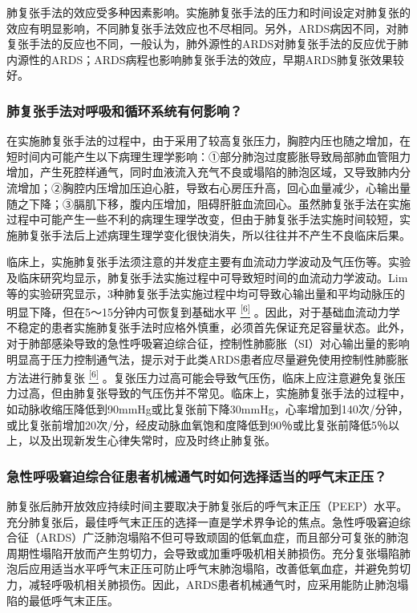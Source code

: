 肺复张手法的效应受多种因素影响。实施肺复张手法的压力和时间设定对肺复张的效应有明显影响，不同肺复张手法效应也不尽相同。另外，ARDS病因不同，对肺复张手法的反应也不同，一般认为，肺外源性的ARDS对肺复张手法的反应优于肺内源性的ARDS；ARDS病程也影响肺复张手法的效应，早期ARDS肺复张效果较好。

\subsubsection{肺复张手法对呼吸和循环系统有何影响？}

在实施肺复张手法的过程中，由于采用了较高复张压力，胸腔内压也随之增加，在短时间内可能产生以下病理生理学影响：①部分肺泡过度膨胀导致局部肺血管阻力增加，产生死腔样通气，同时血液流入充气不良或塌陷的肺泡区域，又导致肺内分流增加；②胸腔内压增加压迫心脏，导致右心房压升高，回心血量减少，心输出量随之下降；③膈肌下移，腹内压增加，阻碍肝脏血流回心。虽然肺复张手法在实施过程中可能产生一些不利的病理生理学改变，但由于肺复张手法实施时间较短，实施肺复张手法后上述病理生理学变化很快消失，所以往往并不产生不良临床后果。

临床上，实施肺复张手法须注意的并发症主要有血流动力学波动及气压伤等。实验及临床研究均显示，肺复张手法实施过程中可导致短时间的血流动力学波动。Lim等的实验研究显示，3种肺复张手法实施过程中均可导致心输出量和平均动脉压的明显下降，但在5～15分钟内可恢复到基础水平
\protect\hyperlink{text00011.htmlux5cux23ch6-10}{\textsuperscript{{[}6{]}}}
。因此，对于基础血流动力学不稳定的患者实施肺复张手法时应格外慎重，必须首先保证充足容量状态。此外，对于肺部感染导致的急性呼吸窘迫综合征，控制性肺膨胀（SI）对心输出量的影响明显高于压力控制通气法，提示对于此类ARDS患者应尽量避免使用控制性肺膨胀方法进行肺复张
\protect\hyperlink{text00011.htmlux5cux23ch6-10}{\textsuperscript{{[}6{]}}}
。复张压力过高可能会导致气压伤，临床上应注意避免复张压力过高，但由肺复张导致的气压伤并不常见。临床上，实施肺复张手法的过程中，如动脉收缩压降低到90mmHg或比复张前下降30mmHg，心率增加到140次/分钟，或比复张前增加20次/分，经皮动脉血氧饱和度降低到90％或比复张前降低5％以上，以及出现新发生心律失常时，应及时终止肺复张。

\subsubsection{急性呼吸窘迫综合征患者机械通气时如何选择适当的呼气末正压？}

肺复张后肺开放效应持续时间主要取决于肺复张后的呼气末正压（PEEP）水平。充分肺复张后，最佳呼气末正压的选择一直是学术界争论的焦点。急性呼吸窘迫综合征（ARDS）广泛肺泡塌陷不但可导致顽固的低氧血症，而且部分可复张的肺泡周期性塌陷开放而产生剪切力，会导致或加重呼吸机相关肺损伤。充分复张塌陷肺泡后应用适当水平呼气末正压可防止呼气末肺泡塌陷，改善低氧血症，并避免剪切力，减轻呼吸机相关肺损伤。因此，ARDS患者机械通气时，应采用能防止肺泡塌陷的最低呼气末正压。


